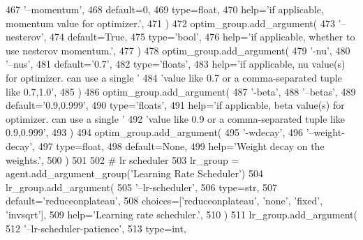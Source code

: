 \begin{DoxyCode}
467             \textcolor{stringliteral}{'--momentum'},
468             default=0,
469             type=float,
470             help=\textcolor{stringliteral}{'if applicable, momentum value for optimizer.'},
471         )
472         optim\_group.add\_argument(
473             \textcolor{stringliteral}{'--nesterov'},
474             default=\textcolor{keyword}{True},
475             type=\textcolor{stringliteral}{'bool'},
476             help=\textcolor{stringliteral}{'if applicable, whether to use nesterov momentum.'},
477         )
478         optim\_group.add\_argument(
479             \textcolor{stringliteral}{'-nu'},
480             \textcolor{stringliteral}{'--nus'},
481             default=\textcolor{stringliteral}{'0.7'},
482             type=\textcolor{stringliteral}{'floats'},
483             help=\textcolor{stringliteral}{'if applicable, nu value(s) for optimizer. can use a single '}
484             \textcolor{stringliteral}{'value like 0.7 or a comma-separated tuple like 0.7,1.0'},
485         )
486         optim\_group.add\_argument(
487             \textcolor{stringliteral}{'-beta'},
488             \textcolor{stringliteral}{'--betas'},
489             default=\textcolor{stringliteral}{'0.9,0.999'},
490             type=\textcolor{stringliteral}{'floats'},
491             help=\textcolor{stringliteral}{'if applicable, beta value(s) for optimizer. can use a single '}
492             \textcolor{stringliteral}{'value like 0.9 or a comma-separated tuple like 0.9,0.999'},
493         )
494         optim\_group.add\_argument(
495             \textcolor{stringliteral}{'-wdecay'},
496             \textcolor{stringliteral}{'--weight-decay'},
497             type=float,
498             default=\textcolor{keywordtype}{None},
499             help=\textcolor{stringliteral}{'Weight decay on the weights.'},
500         )
501 
502         \textcolor{comment}{# lr scheduler}
503         lr\_group = agent.add\_argument\_group(\textcolor{stringliteral}{'Learning Rate Scheduler'})
504         lr\_group.add\_argument(
505             \textcolor{stringliteral}{'--lr-scheduler'},
506             type=str,
507             default=\textcolor{stringliteral}{'reduceonplateau'},
508             choices=[\textcolor{stringliteral}{'reduceonplateau'}, \textcolor{stringliteral}{'none'}, \textcolor{stringliteral}{'fixed'}, \textcolor{stringliteral}{'invsqrt'}],
509             help=\textcolor{stringliteral}{'Learning rate scheduler.'},
510         )
511         lr\_group.add\_argument(
512             \textcolor{stringliteral}{'--lr-scheduler-patience'},
513             type=int,

\end{DoxyCode}

